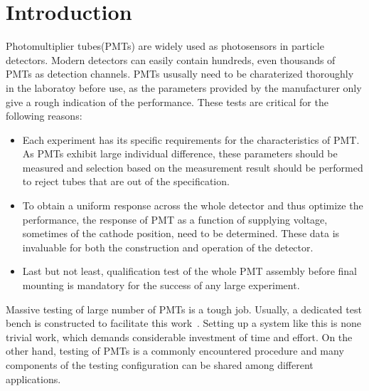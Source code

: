 \documentclass[review,number,sort&compress]{elsarticle}
\begin{document}
\section{Introduction}
\label{sec:introduction}

Photomultiplier tubes(PMTs) are widely used as photosensors in particle detectors.
Modern detectors can easily contain hundreds, even thousands of PMTs as detection channels.
PMTs ususally need to be charaterized thoroughly in the laboratoy before use, as the parameters provided by the manufacturer only give a rough indication of the performance.
These tests are critical for the following reasons:
\begin{itemize}
 \item Each experiment has its specific requirements for the characteristics of PMT.
 As PMTs exhibit large individual difference, these parameters should be measured and selection based on the measurement result should be performed to reject tubes that are out of the specification.
 \item To obtain a uniform response across the whole detector and thus optimize the performance, the response of PMT as a function of supplying voltage, sometimes of the cathode position, need to be determined.
  These data is invaluable for both the construction and operation of the detector. 
 \item Last but not least, qualification test of the whole PMT assembly before final mounting is mandatory for the success of any large experiment. 
\end{itemize}

Massive testing of large number of PMTs is a tough job.
Usually, a dedicated test bench is constructed to facilitate this work~\cite{barnhill_testing_2008,akgun_complete_2005,adragna_pmt-block_2006}.
Setting up a system like this is none trivial work, which demands considerable investment of time and effort.
On the other hand, testing of PMTs is a commonly encountered procedure and many components of the testing configuration can be shared among different applications.
\end{document}
